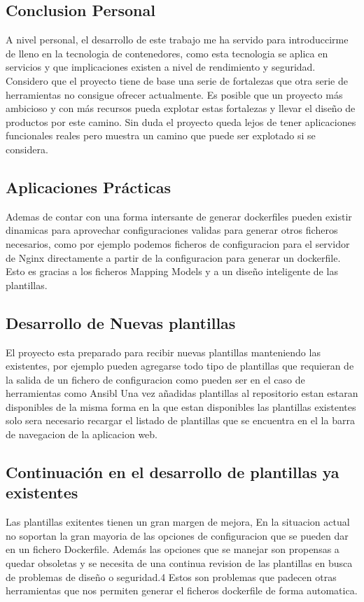 \documentclass[12pt, a4paper, twoside]{article}
\begin{document}
\subsection{Conclusion Personal}
A nivel personal, el desarrollo de este trabajo me ha servido para introduccirme de lleno en la tecnologia de contenedores, como esta tecnologia se aplica en servicios y que implicaciones existen a nivel de rendimiento y seguridad. Considero que el proyecto tiene de base una serie de fortalezas que otra serie de herramientas no consigue ofrecer actualmente. Es posible que un proyecto más ambicioso y con más recursos pueda explotar estas fortalezas y llevar el diseño de productos por este camino.
Sin duda el proyecto queda lejos de tener aplicaciones funcionales reales pero muestra un camino que puede ser explotado si se considera. 
\subsection{Aplicaciones Prácticas}
Ademas de contar con una forma intersante de generar dockerfiles pueden existir dinamicas para aprovechar configuraciones validas para generar otros ficheros necesarios, como por ejemplo podemos ficheros de configuracion para el servidor de Nginx \cite{nginx} directamente a partir de la configuracion para generar un dockerfile. 
Esto es gracias a los ficheros Mapping Models y a un diseño inteligente de las plantillas.
\subsection{Desarrollo de Nuevas plantillas }
El proyecto esta preparado para recibir nuevas plantillas manteniendo las existentes, por ejemplo pueden agregarse todo tipo de plantillas que requieran de la salida de un fichero de configuracion como pueden ser en el caso de herramientas como Ansibl \cite{ansible}	 
Una vez añadidas plantillas al repositorio estan estaran disponibles de la misma forma en la que estan disponibles las plantillas existentes solo sera necesario recargar el listado de plantillas que se encuentra en el la barra de navegacion de la aplicacion web.	
\subsection{Continuación en el desarrollo de plantillas ya existentes}
Las plantillas exitentes tienen un gran margen de mejora, En la situacion actual no soportan la gran mayoria de las opciones de configuracion que se pueden dar en un fichero Dockerfile. Además las opciones que se manejar son propensas a quedar obsoletas y se necesita de una continua revision de las plantillas en busca de problemas de diseño o seguridad.4
Estos son problemas que padecen otras herramientas que nos permiten generar el ficheros dockerfile de forma automatica.
\end{document}
